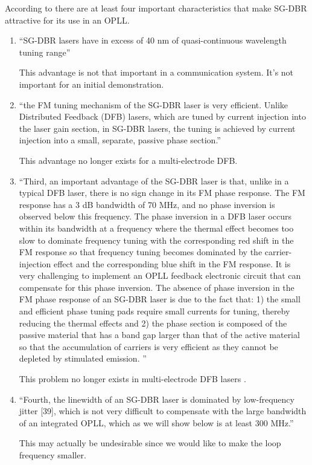 \documentclass[a4paper]{article}
\begin{document}
According to \cite[Section III]{Ristic2010} there are at least four important characteristics that make SG-DBR attractive for its use in an OPLL.

\begin{enumerate}
	\item ``SG-DBR lasers have in excess of 40 nm of quasi-continuous wavelength tuning range''
	
	This advantage is not that important in a communication system. It's not important for an initial demonstration. 
	
	\item ``the FM tuning mechanism of the SG-DBR laser is very efficient. Unlike Distributed Feedback (DFB) lasers, which are tuned by current injection into the laser gain section, in SG-DBR lasers, the tuning is achieved by current injection into a small, separate, passive phase section.''
	
	This advantage no longer exists for a multi-electrode DFB.
	
	\item ``Third, an important advantage of the SG-DBR laser is that, unlike in a typical DFB laser, there is no sign change in its FM phase response. The FM response has a 3 dB bandwidth of 70 MHz, and no phase inversion is observed below this frequency. The phase inversion in a DFB laser occurs within its bandwidth at a frequency where the thermal effect becomes too slow to dominate frequency tuning with the corresponding red shift in the FM response so that frequency tuning becomes dominated by the carrier-injection effect and the corresponding blue shift in the FM response. It is very challenging to implement an OPLL feedback electronic circuit that can compensate for this phase inversion. The absence of phase inversion in the FM phase response of an SG-DBR laser is due to the fact that: 1) the small and efficient phase tuning pads require small currents for tuning, thereby reducing the thermal effects and 2) the phase section is composed of the passive material that has a band gap larger than that of the active material so that the accumulation of carriers is very efficient as they cannot be depleted by stimulated emission. ''
	
	This problem no longer exists in multi-electrode DFB lasers \cite{Jacquet1993}.
	
	\item ``Fourth, the linewidth of an SG-DBR laser is dominated by low-frequency jitter [39], which is not very difficult to compensate with the large bandwidth of an integrated OPLL, which as we will show below is at least 300 MHz.'' 
	
	This may actually be undesirable since we would like to make the loop frequency smaller.
	
\end{enumerate}
\end{document}
